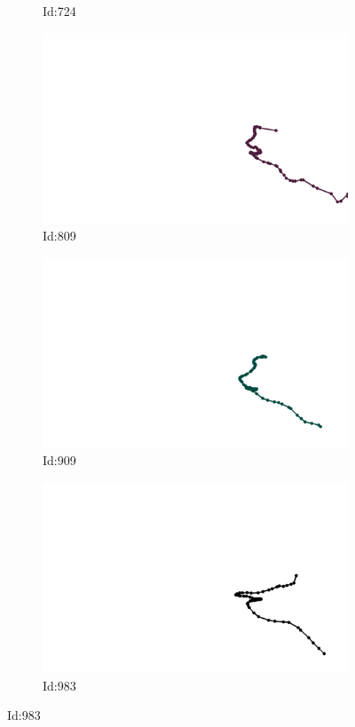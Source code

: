 \documentclass[12pt,twoside]{report}
\begin{document}
\begin{figure}
\begin{subfigure}[b]{0.20\textwidth}
\caption{Id:724}
\end{subfigure}
\begin{subfigure}[b]{0.20\textwidth}
\centering
\includegraphics[width=\textwidth]{../../trajectories/809.png}
\caption{Id:809}
\end{subfigure}
\begin{subfigure}[b]{0.20\textwidth}
\centering
\includegraphics[width=\textwidth]{../../trajectories/909.png}
\caption{Id:909}
\end{subfigure}
\begin{subfigure}[b]{0.20\textwidth}
\centering
\includegraphics[width=\textwidth]{../../trajectories/983.png}
\caption{Id:983}
\end{subfigure}
\end{figure}
\end{document}
